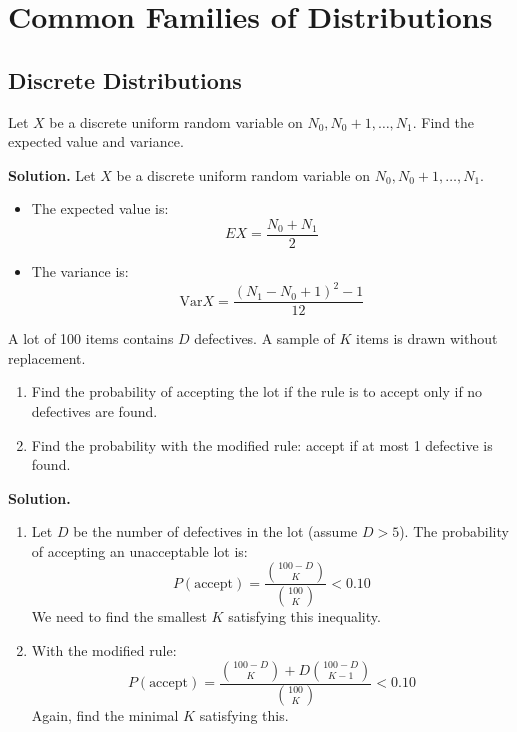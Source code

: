 
\chapter{Common Families of Distributions}

\section{Discrete Distributions}

\begin{problembox}
Let \( X \) be a discrete uniform random variable on \( N_0, N_0+1, \ldots, N_1 \). Find the expected value and variance.
\end{problembox}

\noindent\textbf{Solution.}
Let \( X \) be a discrete uniform random variable on \( N_0, N_0+1, \ldots, N_1 \). 

\begin{itemize}
\item The expected value is:
\[ EX = \frac{N_0 + N_1}{2} \]

\item The variance is:
\[ \text{Var}X = \frac{(N_1 - N_0 + 1)^2 - 1}{12} \]
\end{itemize}

\begin{problembox}
A lot of 100 items contains \( D \) defectives. A sample of \( K \) items is drawn without replacement.
\begin{enumerate}[label=(\alph*)]
\item Find the probability of accepting the lot if the rule is to accept only if no defectives are found.
\item Find the probability with the modified rule: accept if at most 1 defective is found.
\end{enumerate}
\end{problembox}

\noindent\textbf{Solution.}
\begin{enumerate}[label=(\alph*)]
\item Let \( D \) be the number of defectives in the lot (assume \( D > 5 \)). The probability of accepting an unacceptable lot is:
\[ P(\text{accept}) = \frac{\binom{100-D}{K}}{\binom{100}{K}} < 0.10 \]
We need to find the smallest \( K \) satisfying this inequality.

\item With the modified rule:
\[ P(\text{accept}) = \frac{\binom{100-D}{K} + D\binom{100-D}{K-1}}{\binom{100}{K}} < 0.10 \]
Again, find the minimal \( K \) satisfying this.
\end{enumerate}

